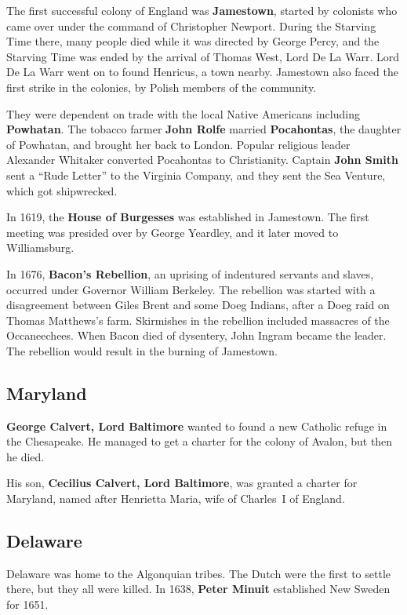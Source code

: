 The first successful colony of England was \textbf{Jamestown},
started by colonists who came over under the command of Christopher Newport.
During the Starving Time there, many people died while it was directed by George Percy,
and the Starving Time was ended by the arrival of Thomas West, Lord De La Warr.
Lord De La Warr went on to found Henricus, a town nearby.
Jamestown also faced the first strike in the colonies, by Polish members of the community.

They were dependent on trade with the local Native Americans including \textbf{Powhatan}.
The tobacco farmer \textbf{John Rolfe} married \textbf{Pocahontas},
the daughter of Powhatan, and brought her back to London.
Popular religious leader Alexander Whitaker converted Pocahontas to Christianity.
Captain \textbf{John Smith} sent a ``Rude Letter'' to the Virginia Company,
and they sent the Sea Venture, which got shipwrecked.

In 1619, the \textbf{House of Burgesses} was established in Jamestown.
The first meeting was presided over by George Yeardley,
and it later moved to Williamsburg.

In 1676, \textbf{Bacon's Rebellion}, an uprising of indentured servants and slaves,
occurred under Governor William Berkeley.
The rebellion was started with a disagreement between Giles Brent and some Doeg Indians,
after a Doeg raid on Thomas Matthews's farm.
Skirmishes in the rebellion included massacres of the Occaneechees.
When Bacon died of dysentery, John Ingram became the leader.
The rebellion would result in the burning of Jamestown.

\subsection*{Maryland}

\textbf{George Calvert, Lord Baltimore} wanted to found a new Catholic refuge in the Chesapeake.
He managed to get a charter for the colony of Avalon, but then he died.

His son, \textbf{Cecilius Calvert, Lord Baltimore}, was granted a charter for Maryland,
named after Henrietta Maria, wife of Charles~I of England.

\subsection*{Delaware}

Delaware was home to the Algonquian tribes.
The Dutch were the first to settle there, but they all were killed.
In 1638, \textbf{Peter Minuit} established New Sweden for 1651.

